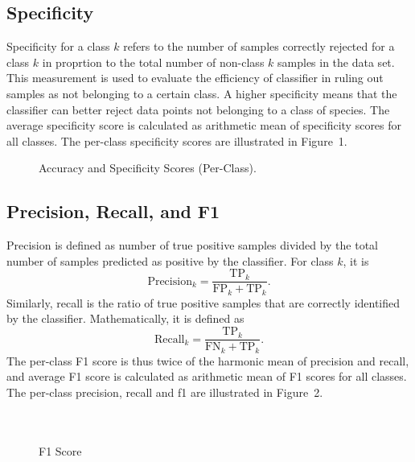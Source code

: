 \documentclass[]{report}   %
\begin{document}
\subsection*{Specificity}
Specificity for a class $k$ refers to the number of samples correctly rejected for a class
$k$ in proprtion to the total number of non-class $k$ samples in the data set. This measurement is used to evaluate the efficiency of classifier in ruling out samples as not belonging to a certain class. A higher specificity means that the classifier can
better reject data points not belonging to a class of species. The average specificity score is calculated as arithmetic mean of specificity scores for all classes. The per-class specificity scores are illustrated in Figure~1.


\begin{figure}
\label{fig:d}
\caption{Accuracy and Specificity Scores (Per-Class).}
    \centering
    \def\svgwidth{\columnwidth}
    
\end{figure}


\newpage
\subsection*{Precision, Recall, and F1}
Precision is defined as number of true positive samples divided by the total number of samples predicted as positive by the classifier. For class $k$, it is
\begin{equation}
\textrm{Precision}_k = \frac{\textrm{TP}_k}{\textrm{FP}_k+\textrm{TP}_k}.
\end{equation}
Similarly, recall is the ratio of true positive samples that are correctly identified by the classifier. Mathematically, it is defined as
\begin{equation}
\textrm{Recall}_k = \frac{\textrm{TP}_k}{\textrm{FN}_k+\textrm{TP}_k}.
\end{equation}
The per-class F1 score is thus twice of the harmonic mean of precision and recall, and average F1 score is calculated as arithmetic mean of F1 scores for all classes. The per-class precision, recall and f1 are illustrated in Figure~2.
\\\\\\
\begin{figure}[H]
\label{fig:?}
\caption{F1 Score}
    \centering
    \def\svgwidth{\columnwidth}
    
\end{figure}
\end{document}
